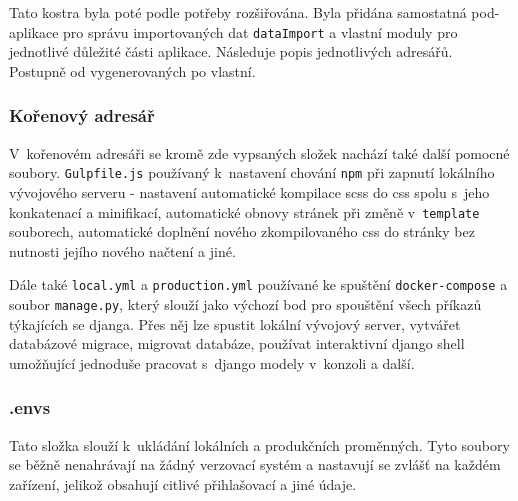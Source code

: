 \begin{minipage}[t]{.5\textwidth}
\end{minipage}
\begin{minipage}[t]{.5\textwidth}
\end{minipage}

\vspace{0.5cm}
Tato kostra byla poté podle potřeby rozšiřována. Byla přidána samostatná pod-aplikace pro správu importovaných dat \texttt{dataImport} a vlastní moduly pro jednotlivé důležité části aplikace. Následuje popis jednotlivých adresářů. Postupně od vygenerovaných po vlastní.

\subsubsection{Kořenový adresář}
V~kořenovém adresáři se kromě zde vypsaných složek nachází také další pomocné soubory. \texttt{Gulpfile.js} používaný k~nastavení chování \texttt{npm} při zapnutí lokálního vývojového serveru - nastavení automatické kompilace scss do css spolu s~jeho konkatenací a minifikací, automatické obnovy stránek při změně v~\texttt{template} souborech, automatické doplnění nového zkompilovaného css do stránky bez nutnosti jejího nového načtení a jiné.
\par Dále také \texttt{local.yml} a \texttt{production.yml} používané ke spuštění \texttt{docker-compose} a soubor \texttt{manage.py}, který slouží jako výchozí bod pro spouštění všech příkazů týkajících se djanga. Přes něj lze spustit lokální vývojový server, vytvářet databázové migrace, migrovat databáze, používat interaktivní django shell umožňující jednoduše pracovat s~django modely v~konzoli a další. 

\subsubsection{.envs}
Tato složka slouží k~ukládání lokálních a produkčních proměnných. Tyto soubory se běžně nenahrávají na žádný verzovací systém a nastavují se zvlášť na každém zařízení, jelikož obsahují citlivé přihlašovací a jiné údaje.

